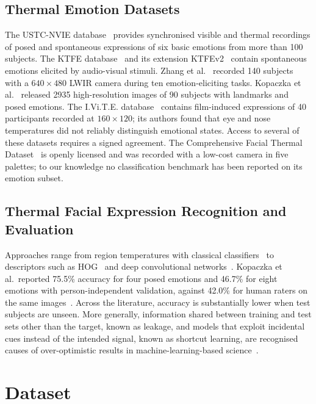 \documentclass[10pt,twocolumn,letterpaper]{article}
\begin{document}
\subsection{Thermal Emotion Datasets}
The USTC-NVIE database~\cite{nvie} provides synchronised visible and thermal recordings of posed and spontaneous expressions of six basic emotions from more than 100 subjects. The KTFE database~\cite{ktfe} and its extension KTFEv2~\cite{ktfev2} contain spontaneous emotions elicited by audio-visual stimuli. Zhang et al.~\cite{zhang2016} recorded 140 subjects with a $640\times480$ LWIR camera during ten emotion-eliciting tasks. Kopaczka et al.~\cite{kopaczka2018,kopaczka2019} released 2935 high-resolution images of 90 subjects with landmarks and posed emotions. The I.Vi.T.E. database~\cite{esposito2022} contains film-induced expressions of 40 participants recorded at $160\times120$; its authors found that eye and nose temperatures did not reliably distinguish emotional states. Access to several of these datasets requires a signed agreement. The Comprehensive Facial Thermal Dataset~\cite{dataset,abuhussein2024} is openly licensed and was recorded with a low-cost camera in five palettes; to our knowledge no classification benchmark has been reported on its emotion subset.

\subsection{Thermal Facial Expression Recognition and Evaluation}
Approaches range from region temperatures with classical classifiers~\cite{cruz2017} to descriptors such as HOG~\cite{dalal2005} and deep convolutional networks~\cite{corneanu2016}. Kopaczka et al.\ reported 75.5\% accuracy for four posed emotions and 46.7\% for eight emotions with person-independent validation, against 42.0\% for human raters on the same images~\cite{kopaczka2019}. Across the literature, accuracy is substantially lower when test subjects are unseen. More generally, information shared between training and test sets other than the target, known as leakage, and models that exploit incidental cues instead of the intended signal, known as shortcut learning, are recognised causes of over-optimistic results in machine-learning-based science~\cite{kapoor2023,geirhos2020}.

\section{Dataset}
\end{document}
